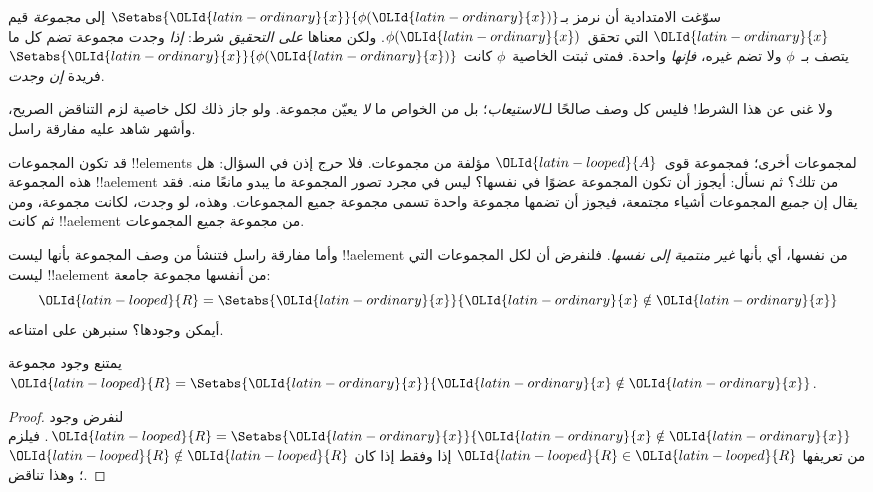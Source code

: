 \documentclass[../../../include/open-logic-section]{subfiles}
\begin{document}

سوّغت الامتدادية أن نرمز بـ$\Setabs{{\OLId{latin-ordinary}{x}}}{\phi({\OLId{latin-ordinary}{x}})}$ إلى \emph{مجموعة}
قيم ${\OLId{latin-ordinary}{x}}$ التي تحقق~$\phi({\OLId{latin-ordinary}{x}})$. ولكن معناها \emph{على التحقيق} شرط:
\emph{إذا} وجدت مجموعة تضم كل ما يتصف بـ~$\phi$ ولا تضم غيره،
\emph{فإنها} واحدة. فمتى ثبتت الخاصية~$\phi$ كانت
$\Setabs{{\OLId{latin-ordinary}{x}}}{\phi({\OLId{latin-ordinary}{x}})}$ فريدة \emph{إن وجدت}.

ولا غنى عن هذا الشرط!{} فليس كل وصف صالحًا لـ\emph{الاستيعاب}؛
بل من الخواص ما \emph{لا} يعيّن مجموعة. ولو جاز ذلك لكل خاصية لزم
التناقض الصريح، وأشهر شاهد عليه مفارقة راسل.

قد تكون المجموعات !!{element}s لمجموعات أخرى؛ فمجموعة قوى~${\OLId{latin-looped}{A}}$ مؤلفة
من مجموعات. فلا حرج إذن في السؤال: هل هذه المجموعة !!a{element}
من تلك؟ ثم نسأل: أيجوز أن تكون المجموعة عضوًا في نفسها؟
ليس في مجرد تصور المجموعة ما يبدو مانعًا منه. فقد يقال إن
\emph{جميع} المجموعات أشياء مجتمعة، فيجوز أن تضمها مجموعة واحدة
تسمى مجموعة جميع المجموعات. وهذه، لو وجدت، لكانت مجموعة، ومن ثم
كانت !!a{element} من مجموعة جميع المجموعات.

وأما مفارقة راسل فتنشأ من وصف المجموعة بأنها ليست !!a{element} من
نفسها، أي بأنها \emph{غير منتمية إلى نفسها}. فلنفرض أن لكل
المجموعات التي ليست !!a{element} من أنفسها مجموعة جامعة:
\[
{\OLId{latin-looped}{R}} = \Setabs{{\OLId{latin-ordinary}{x}}}{{\OLId{latin-ordinary}{x}} \notin {\OLId{latin-ordinary}{x}}}
\]
أيمكن وجودها؟ سنبرهن على امتناعه.

\begin{thm}
يمتنع وجود مجموعة ${\OLId{latin-looped}{R}} = \Setabs{{\OLId{latin-ordinary}{x}}}{{\OLId{latin-ordinary}{x}} \notin {\OLId{latin-ordinary}{x}}}$.
\end{thm}

\begin{proof}
لنفرض وجود ${\OLId{latin-looped}{R}} = \Setabs{{\OLId{latin-ordinary}{x}}}{{\OLId{latin-ordinary}{x}} \notin {\OLId{latin-ordinary}{x}}}$. فيلزم من تعريفها
${\OLId{latin-looped}{R}} \in {\OLId{latin-looped}{R}}$ إذا وفقط إذا كان ${\OLId{latin-looped}{R}} \notin {\OLId{latin-looped}{R}}$؛ وهذا تناقض.
\end{proof}
\end{document}
